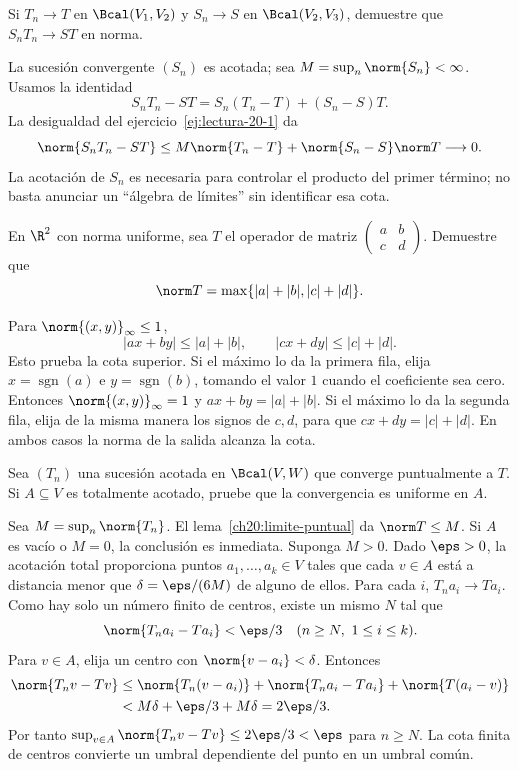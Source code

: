 \begin{ejercicio}\label{ej:lectura-20-5}
Si $T_n\to T$ en $\Bcal(V_1,V_2)$ y $S_n\to S$ en $\Bcal(V_2,V_3)$, demuestre que $S_nT_n\to ST$ en norma.
\end{ejercicio}
\begin{solucion}
La sucesión convergente $(S_n)$ es acotada; sea $M=\sup_n\norm{S_n}<\infty$. Usamos la identidad
\[
 S_nT_n-ST=S_n(T_n-T)+(S_n-S)T.
\]
La desigualdad del ejercicio~\ref{ej:lectura-20-1} da
\[
 \norm{S_nT_n-ST}\leq M\norm{T_n-T}+\norm{S_n-S}\norm T\longrightarrow0.
\]
La acotación de $S_n$ es necesaria para controlar el producto del primer término; no basta anunciar un ``álgebra de límites'' sin identificar esa cota.
\end{solucion}

\begin{ejercicio}\label{ej:lectura-20-6}
En $\R^2$ con norma uniforme, sea $T$ el operador de matriz $\begin{pmatrix}a&b\\c&d\end{pmatrix}$. Demuestre que
\[\norm T=\max\{|a|+|b|,|c|+|d|\}.\]
\end{ejercicio}
\begin{solucion}
Para $\norm{(x,y)}_\infty\leq1$,
\[
 |ax+by|\leq|a|+|b|,\qquad |cx+dy|\leq|c|+|d|.
\]
Esto prueba la cota superior. Si el máximo lo da la primera fila, elija $x=\operatorname{sgn}(a)$ e $y=\operatorname{sgn}(b)$, tomando el valor $1$ cuando el coeficiente sea cero. Entonces $\norm{(x,y)}_\infty=1$ y $ax+by=|a|+|b|$. Si el máximo lo da la segunda fila, elija de la misma manera los signos de $c,d$, para que $cx+dy=|c|+|d|$. En ambos casos la norma de la salida alcanza la cota.
\end{solucion}

\begin{ejercicio}\label{ej:lectura-20-7}
Sea $(T_n)$ una sucesión acotada en $\Bcal(V,W)$ que converge puntualmente a $T$. Si $A\subseteq V$ es totalmente acotado, pruebe que la convergencia es uniforme en $A$.
\end{ejercicio}
\begin{solucion}
Sea $M=\sup_n\norm{T_n}$. El lema~\ref{ch20:limite-puntual} da $\norm T\leq M$. Si $A$ es vacío o $M=0$, la conclusión es inmediata. Suponga $M>0$. Dado $\eps>0$, la acotación total proporciona puntos $a_1,\ldots,a_k\in V$ tales que cada $v\in A$ está a distancia menor que $\delta=\eps/(6M)$ de alguno de ellos. Para cada $i$, $T_na_i\to Ta_i$. Como hay solo un número finito de centros, existe un mismo $N$ tal que
\[
 \norm{T_na_i-Ta_i}<\eps/3\quad(n\geq N,\ 1\leq i\leq k).
\]
Para $v\in A$, elija un centro con $\norm{v-a_i}<\delta$. Entonces
\begin{align*}
 \norm{T_nv-Tv}
 &\leq\norm{T_n(v-a_i)}+\norm{T_na_i-Ta_i}+\norm{T(a_i-v)}\\
 &<M\delta+\eps/3+M\delta=2\eps/3.
\end{align*}
Por tanto $\sup_{v\in A}\norm{T_nv-Tv}\leq2\eps/3<\eps$ para $n\geq N$. La cota finita de centros convierte un umbral dependiente del punto en un umbral común.
\end{solucion}

